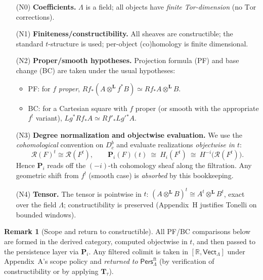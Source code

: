 \documentclass[11pt]{article}
\numberwithin{equation}{section}
\theoremstyle{plain}
\theoremstyle{definition}
\theoremstyle{remark}
\newcommand{\Pers}{\mathsf{Pers}}
\theoremstyle{plain}
\theoremstyle{definition}
\numberwithin{equation}{section}
\theoremstyle{definition}
\newtheorem{remark}[theorem]{Remark}
\numberwithin{equation}{section}
\theoremstyle{plain}
\theoremstyle{definition}
\theoremstyle{remark}
\begin{document}
\begin{itemize}\itemsep0.35em
  \item[(N0)] \textbf{Coefficients.} \(\Lambda\) is a field; all objects have \emph{finite Tor-dimension} (no \(\mathrm{Tor}\) corrections).
  \item[(N1)] \textbf{Finiteness/constructibility.} All sheaves are constructible; the standard \(t\)-structure is used; per-object (co)homology is finite dimensional.
  \item[(N2)] \textbf{Proper/smooth hypotheses.} Projection formula (PF) and base change (BC) are taken under the usual hypotheses:
  \begin{itemize}\itemsep0.1em
    \item PF: for \(f\) \emph{proper}, \(Rf_\ast(A\otimes^\mathbf{L} f^\ast B)\simeq Rf_\ast A\otimes^\mathbf{L} B\).
    \item BC: for a Cartesian square with \(f\) proper (or smooth with the appropriate \(f^!\) variant),
    \(Lg^\ast Rf_\ast A \simeq Rf'_\ast Lg'{}^\ast A\).
  \end{itemize}
  \item[(N3)] \textbf{Degree normalization and objectwise evaluation.}
  We use the \emph{cohomological} convention on \(D^b_c\) and evaluate realizations \emph{objectwise in \(t\)}:
  \[
     \mathcal{R}(F)^t \cong \mathcal{R}(F^t),\qquad
        \mathbf{P}_i(F)(t)\ \cong\ H_i(F^t)\ \cong\ H^{-i}\!\big(\mathcal{R}(F^t)\big).
  \]
  Hence \(\mathbf{P}_i\) reads off the \((-i)\)-th cohomology sheaf along the filtration.
  Any geometric shift from \(f^!\) (smooth case) is \emph{absorbed} by this bookkeeping.
  \item[(N4)] \textbf{Tensor.} The tensor is pointwise in \(t\):
  \((A\otimes^\mathbf{L} B)^t \cong A^t\otimes^\mathbf{L} B^t\), exact over the field \(\Lambda\);
  constructibility is preserved (Appendix~H justifies Tonelli on bounded windows).
\end{itemize}

\begin{remark}[Scope and return to constructible]
All PF/BC comparisons below are formed in the derived category, computed objectwise in \(t\), and then passed to the persistence layer via \(\mathbf{P}_i\).
Any filtered colimit is taken in \([\mathbb{R},\mathsf{Vect}_\Lambda]\) under Appendix~A’s scope policy and \emph{returned to} \(\Pers^{\mathrm{ft}}_\Lambda\) (by verification of constructibility or by applying \(\mathbf{T}_\tau\)).
\end{remark}
\end{document}
